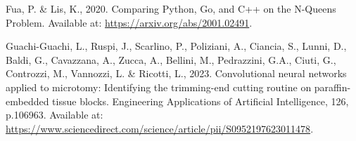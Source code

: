 \begin{thebibliography}{99}
    Fua, P. \& Lis, K., 2020. Comparing Python, Go, and C++ on the N-Queens Problem. Available at: \url{https://arxiv.org/abs/2001.02491}.

    Guachi-Guachi, L., Ruspi, J., Scarlino, P., Poliziani, A., Ciancia, S., Lunni, D., Baldi, G., Cavazzana, A., Zucca, A., Bellini, M., Pedrazzini, G.A., Ciuti, G., Controzzi, M., Vannozzi, L. \& Ricotti, L., 2023. Convolutional neural networks applied to microtomy: Identifying the trimming-end cutting routine on paraffin-embedded tissue blocks. Engineering Applications of Artificial Intelligence, 126, p.106963. Available at: \url{https://www.sciencedirect.com/science/article/pii/S0952197623011478}.
    
\end{thebibliography}